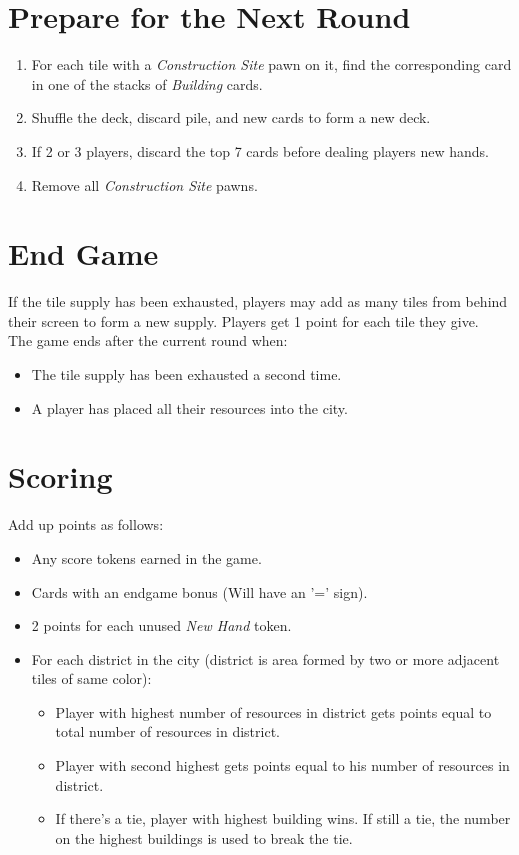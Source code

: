 \documentclass[12pt]{article}
\newenvironment{enumerateCustom}
{\begin{enumerate}
  \setlength{\itemsep}{1pt}
  \setlength{\parskip}{0pt}
  \setlength{\parsep}{0pt}}
{\end{enumerate}}
\newenvironment{itemizeCustom}
{\begin{itemize}
  \setlength{\itemsep}{1pt}
  \setlength{\parskip}{0pt}
  \setlength{\parsep}{0pt}}
{\end{itemize}}
\begin{document}
\begin{multicols*}{2}
\section*{Prepare for the Next Round}
\begin{enumerateCustom}
	\item For each tile with a \emph{Construction Site} pawn on it, find the corresponding card in one of the stacks of \emph{Building} cards.
	\item Shuffle the deck, discard pile, and new cards to form a new deck.
	\item If 2 or 3 players, discard the top 7 cards before dealing players new hands.
	\item Remove all \emph{Construction Site} pawns.
\end{enumerateCustom}

\section*{End Game}
If the tile supply has been exhausted, players may add as many tiles from behind their screen to form a new supply. Players get 1 point for each tile they give.\\
The game ends after the current round when:
\begin{itemizeCustom}
	\item The tile supply has been exhausted a second time.
	\item A player has placed all their resources into the city.
\end{itemizeCustom}

\section*{Scoring}
Add up points as follows:
\begin{itemizeCustom}
	\item Any score tokens earned in the game.
	\item Cards with an endgame bonus (Will have an '=' sign).
	\item 2 points for each unused \emph{New Hand} token.
	\item For each district in the city (district is area formed by two or more adjacent tiles of same color):
		\begin{itemizeCustom}
			\item Player with highest number of resources in district gets points equal to total number of resources in district.
			\item Player with second highest gets points equal to his number of resources in district.
			\item If there's a tie, player with highest building wins. If still a tie, the number on the highest buildings is used to break the tie.
		\end{itemizeCustom}
\end{itemizeCustom}

\end{multicols*}
\end{document}
